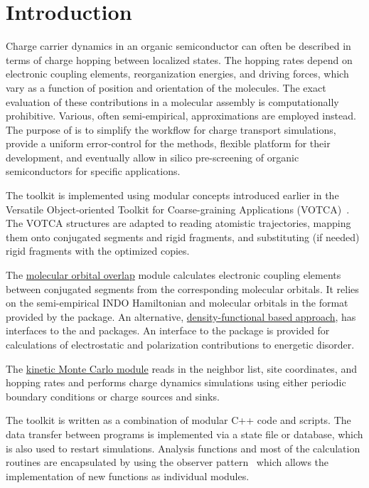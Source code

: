 \chapter{Introduction}
\label{sec:introduction}

Charge carrier dynamics in an organic semiconductor can often be described in terms of charge hopping between localized states. The hopping rates depend on electronic coupling elements, reorganization energies, and driving forces, which vary as a function of position and orientation of the molecules.  The exact evaluation of these contributions in a molecular assembly is computationally prohibitive. Various, often semi-empirical, approximations are employed instead. The purpose of \votcact is to simplify the workflow for charge transport simulations, provide a uniform error-control for the methods, flexible platform for their development, and eventually allow in silico pre-screening of organic semiconductors for specific applications. 

The toolkit is implemented using modular concepts introduced earlier in the Versatile Object-oriented Toolkit for Coarse-graining Applications (VOTCA)~\cite{ruehle_versatile_2009}. The VOTCA structures are adapted to reading atomistic trajectories, mapping them onto conjugated segments and rigid fragments, and substituting (if needed) rigid fragments with the optimized copies. 

The \hyperref[sec:moo]{molecular orbital overlap} module calculates electronic coupling elements between  conjugated segments from the corresponding molecular orbitals. It relies on the semi-empirical INDO Hamiltonian and molecular orbitals in the format provided by the \gaussian package. An alternative,  \hyperref[sec:dft]{density-functional based approach}, has interfaces to the \gaussian and \turbomole packages. An interface to the \tinker package is provided for calculations of electrostatic and polarization contributions to energetic disorder. 

The  \hyperref[sec:kmc]{kinetic Monte Carlo module} reads in the neighbor list, site coordinates, and hopping rates and performs charge dynamics simulations using either periodic boundary conditions or charge sources and sinks. 

The toolkit is written as a combination of modular C++ code and scripts. The data transfer between programs is implemented via a state file or database, which is also used to restart simulations. Analysis functions and most of the calculation routines are encapsulated by using the observer pattern~\cite{gamma_design_1995} which allows the implementation of new functions as individual modules.